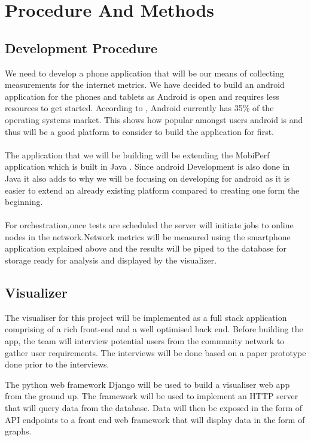 \section{Procedure And Methods}
\subsection{Development Procedure}
We need to develop a phone application that will be our means of collecting measurements for the internet metrics. We have decided to build an android application for the phones and tablets as Android is open and requires less resources to get started. According to \cite{statcounter_global_stats}, Android currently has 35\% of the operating systems market. This shows how popular amongst users android is and thus will be a good platform to consider to build the application for first. 
\paragraph{}
The application that we will be building will be extending the MobiPerf application which is built in Java \cite{m-lab}. Since android Development is also done in Java it also adds to why we will be focusing on developing for android as it is easier to extend an already existing platform compared to creating one form the beginning.

\paragraph{}
For orchestration,once tests are scheduled the server will initiate jobs to online nodes in the network.Network metrics will be measured using the smartphone application explained above and the results will be piped to the database for storage ready for analysis and displayed by the visualizer.    

\subsection{Visualizer}
The visualiser for this project will be implemented as a full stack application comprising of a rich front-end and a well optimised back end. Before building the app, the team will interview potential users from the community network to gather user requirements. The interviews will be done based on a paper prototype done prior to the interviews.

The python web framework Django will be used to build a visualiser web app from the ground up. The framework will be used to implement an HTTP server that will query data from the database. Data will then be exposed in the form of API endpoints to a front end web framework that will display data in the form of graphs.


